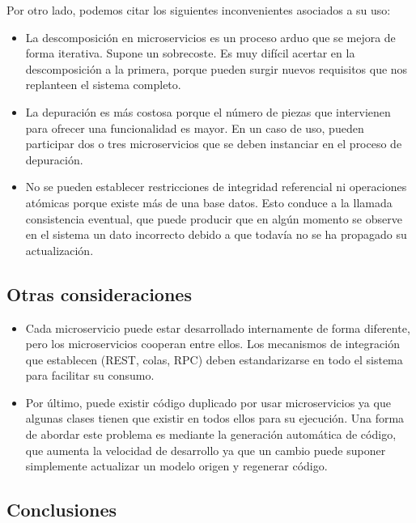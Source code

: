 \documentclass[11pt,a4paper]{article}
\begin{document}
Por otro lado, podemos citar los siguientes inconvenientes asociados a su uso:

\begin{itemize}

\item La descomposición en microservicios es un proceso arduo que se mejora de forma iterativa. Supone un sobrecoste. Es muy difícil acertar en la descomposición a la primera, porque pueden surgir nuevos requisitos que nos replanteen el sistema completo.

\item La depuración es más costosa porque el número de piezas que intervienen para ofrecer una funcionalidad es mayor. En un caso de uso, pueden participar dos o tres microservicios que se deben instanciar en el proceso de depuración.

\item No se pueden establecer restricciones de integridad referencial ni operaciones atómicas porque existe más de una base datos. Esto conduce a la llamada consistencia eventual, que puede producir que en algún momento se observe en el sistema un dato incorrecto debido a que todavía no se ha propagado su actualización.

\end{itemize}

\subsection{Otras consideraciones}

\begin{itemize}

\item Cada microservicio puede estar desarrollado internamente de forma diferente, pero los microservicios cooperan entre ellos. Los mecanismos de integración que establecen (REST, colas, RPC) deben estandarizarse en todo el sistema para facilitar su consumo.

\item Por último, puede existir código duplicado por usar microservicios ya que algunas clases tienen que existir en todos ellos para su ejecución. Una forma de abordar este problema es mediante la generación automática de código, que aumenta la velocidad de desarrollo ya que un cambio puede suponer simplemente actualizar un modelo origen y regenerar código.

\end{itemize}

\subsection{Conclusiones}
\end{document}

